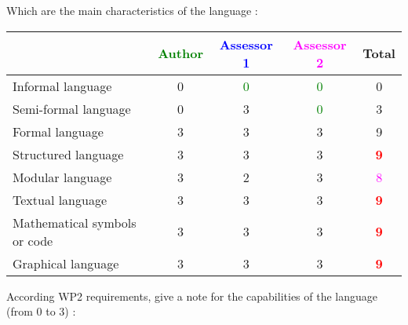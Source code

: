Which are the main characteristics of the language :

\begin{tabular}{|l | c | c | c | c|}
\hline
& \textcolor{green}{Author} & \textcolor{blue}{Assessor 1} & \textcolor{magenta}{Assessor 2} & Total \\
\hline 
Informal language &  0  & \textcolor{green}{0} & \textcolor{green}{0}   &  0 \\
\hline 
Semi-formal language &  0  & 3    & \textcolor{green}{0}   &  3 \\
\hline
Formal language &  3  & 3    &3 &  9 \\
\hline
Structured language &  3  & 3    &3 & \textcolor{red}{\textbf{9}} \\
\hline
Modular language &  3  & 2    &3 & \textcolor{magenta}{8} \\
\hline
Textual language & 3    & 3    &3 & \textcolor{red}{\textbf{9}} \\
\hline
Mathematical symbols or code & 3    & 3    &3 & \textcolor{red}{\textbf{9}} \\
\hline
Graphical language & 3    & 3    &3 & \textcolor{red}{\textbf{9}} \\
\hline
\end{tabular}

According WP2 requirements, give a note for the capabilities of the language (from 0 to 3) :

